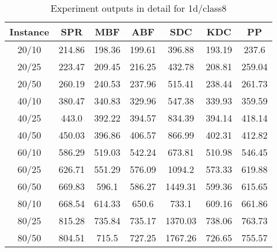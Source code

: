 \begin{table}[ht!]
    \caption{Experiment outputs in detail for 1d/class8}
    \centering
    \begin{tabular}{@{}ccccccc@{}}
        \toprule
        {\bfseries Instance} & {\bfseries SPR} & {\bfseries MBF}
        & {\bfseries ABF} & {\bfseries SDC} & {\bfseries KDC} & {\bfseries PP}\\
        \midrule
        20/10 & 214.86 & 198.36 & 199.61 & 396.88 & 193.19 & 237.6\\
        20/25 & 223.47 & 209.45 & 216.25 & 432.78 & 208.81 & 259.04\\
        20/50 & 260.19 & 240.53 & 237.96 & 515.41 & 238.44 & 261.73\\
        40/10 & 380.47 & 340.83 & 329.96 & 547.38 & 339.93 & 359.59\\
        40/25 & 443.0 & 392.22 & 394.57 & 834.39 & 394.14 & 418.14\\
        40/50 & 450.03 & 396.86 & 406.57 & 866.99 & 402.31 & 412.82\\
        60/10 & 586.29 & 519.03 & 542.24 & 673.81 & 510.98 & 546.45\\
        60/25 & 626.71 & 551.29 & 576.09 & 1094.2 & 573.33 & 619.88\\
        60/50 & 669.83 & 596.1 & 586.27 & 1449.31 & 599.36 & 615.65\\
        80/10 & 668.54 & 614.33 & 650.6 & 733.1 & 609.16 & 661.86\\
        80/25 & 815.28 & 735.84 & 735.17 & 1370.03 & 738.06 & 763.73\\
        80/50 & 804.51 & 715.5 & 727.25 & 1767.26 & 726.65 & 755.57\\
        \bottomrule
    \end{tabular}
\end{table}